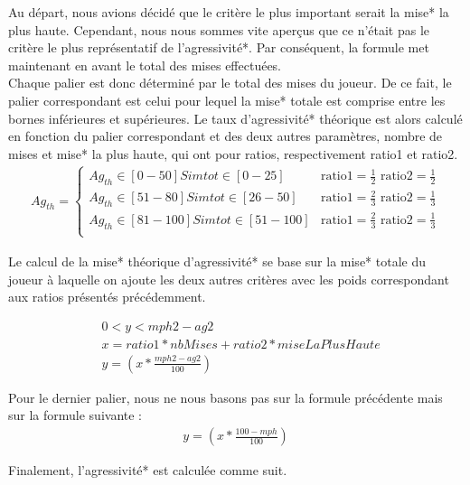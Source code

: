 \documentclass{report}
\begin{document}
Au départ, nous avions décidé que le critère le plus important serait la mise* la plus haute. Cependant, nous nous sommes vite aperçus que ce n'était pas le critère le plus représentatif de l'agressivité*. Par conséquent, la formule met maintenant en avant le total des mises effectuées.\\

Chaque palier est donc déterminé par le total des mises du joueur. De ce fait, le palier correspondant est celui pour lequel la mise* totale est comprise entre les bornes inférieures et supérieures. Le taux d'agressivité* théorique est alors calculé en fonction du palier correspondant et des deux autres paramètres, nombre de mises et mise* la plus haute, qui ont pour ratios, respectivement ratio1 et ratio2. \\

\small{
\begin{align*}
	Ag_{th}=
	\begin{cases}
		Ag_{th} \in [0-50] Si mtot \in [0-25] &\text{ratio1}=\frac{1}{2} \text{ ratio2}=\frac{1}{2} \\
		Ag_{th} \in [51-80] Si mtot \in [26-50] &\text{ratio1}=\frac{2}{3} \text{ ratio2}=\frac{1}{3} \\
		Ag_{th} \in [81-100] Si mtot \in [51-100]  &\text{ratio1}=\frac{2}{3} \text{ ratio2}=\frac{1}{3}\\
	\end{cases}
\end{align*}
}


Le calcul de la mise* théorique d'agressivité* se base sur la mise* totale du joueur à laquelle on ajoute les deux autres critères avec les poids correspondant aux ratios présentés précédemment. \par
\begin{align*}
	&0<y<mph2-ag2\\
	&x=ratio1 * nbMises + ratio2 * miseLaPlusHaute\\
	&y=\left(x*\frac{mph2-ag2}{100}\right)
\end{align*}


Pour le dernier palier, nous ne nous basons pas sur la formule précédente mais sur la formule suivante :\\ 

\begin{align*}
	y=\left(x*\frac{100-mph}{100}\right)
\end{align*}

Finalement, l'agressivité* est calculée comme suit. 
\end{document}
